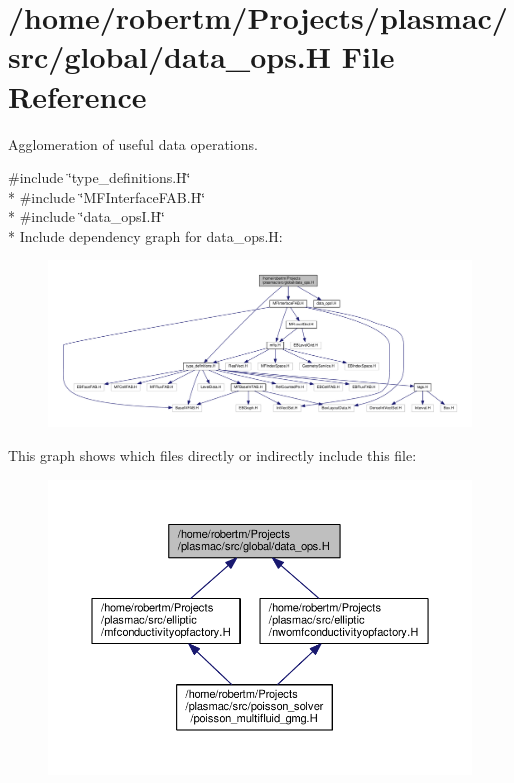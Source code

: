 \hypertarget{data__ops_8H}{}\section{/home/robertm/\+Projects/plasmac/src/global/data\+\_\+ops.H File Reference}
\label{data__ops_8H}


Agglomeration of useful data operations.  


{\ttfamily \#include \char`\"{}type\+\_\+definitions.\+H\char`\"{}}\\*
{\ttfamily \#include \char`\"{}M\+F\+Interface\+F\+A\+B.\+H\char`\"{}}\\*
{\ttfamily \#include \char`\"{}data\+\_\+ops\+I.\+H\char`\"{}}\\*
Include dependency graph for data\+\_\+ops.\+H\+:\nopagebreak
\begin{figure}[H]
\begin{center}
\leavevmode
\includegraphics[width=350pt]{data__ops_8H__incl}
\end{center}
\end{figure}
This graph shows which files directly or indirectly include this file\+:\nopagebreak
\begin{figure}[H]
\begin{center}
\leavevmode
\includegraphics[width=350pt]{data__ops_8H__dep__incl}
\end{center}
\end{figure}
